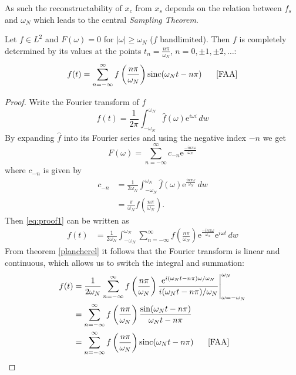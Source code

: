\noindent As such the reconstructability of $x_c$ from $x_s$ depends on the relation between $f_s$ and $\omega_N$ which leads to the central \textit{Sampling Theorem}.
\begin{theorem}\label{sampling_theorem}
Let $f\in L^2$ and $F(\omega)=0$ for $|\omega|\geq \omega_N$ ($f$ bandlimited). Then $f$ is completely determined by its values at the points $t_n=\frac{n\pi}{\omega_N}$, $n=0,\pm 1,\pm 2,\ldots$:
\begin{equation*}
f(t)=\sum_{n=-\infty}^{\infty}f\left(\frac{n\pi}{\omega_N}\right)\mathrm{sinc}(\omega_Nt-n\pi)\phantom{mm}\text{\cite{FAA}}
\end{equation*}
\end{theorem}
\begin{proof}
Write the Fourier transform of $f$
\begin{equation}\label{eq:proof1}
f(t)=\frac{1}{2\pi}\int_{-\omega_N}^{\omega_N}\!\hat{f}(\omega)\mathrm{e}^{i\omega i}\,dw
\end{equation}
By expanding $\hat{f}$ into its Fourier series and using the negative index $-n$ we get
\begin{equation*}
F(\omega)=\sum_{n=-\infty}^{\infty}c_{-n}\mathrm{e}^{\frac{-in\pi\omega}{\omega_N}}
\end{equation*}
where $c_{-n}$ is given by
\begin{align*}
c_{-n}&=\frac{1}{2\omega_N}\int_{-\omega_N}^{\omega_N}\!\hat{f}(\omega)\mathrm{e}^{\frac{in\pi\omega}{\omega_N}}\,dw\\
&=\frac{\pi}{\omega_N}f\left(\frac{n\pi}{\omega_N}\right).
\end{align*}
Then \eqref{eq:proof1} can be written as
\begin{align*}
f(t)&=\frac{1}{2\omega_N}\int_{-\omega_N}^{\omega_N}\!\sum_{n=-\infty}^{\infty}f\left(\frac{n\pi}{\omega_N}\right)\mathrm{e}^{\frac{-in\pi\omega}{\omega_N}}\mathrm{e}^{i\omega t}\,dw
\end{align*}
From theorem \ref{plancherel} it follows that the Fourier transform is linear and continuous, which allows us to switch the integral and summation:
\begin{align*}
f(t)&=\frac{1}{2\omega_N}\sum_{n=-\infty}^{\infty}f\left(\frac{n\pi}{\omega_N}\right)\frac{\mathrm{e}^{i(\omega_Nt-n\pi)\omega/\omega_N}}{i(\omega_Nt-n\pi)/\omega_N}\Bigg|_{\omega=-\omega_N}^{\omega_N}\\
&=\sum_{n=-\infty}^{\infty}f\left(\frac{n\pi}{\omega_N}\right)\frac{\sin(\omega_Nt-n\pi)}{\omega_Nt-n\pi}\\
&=\sum_{n=-\infty}^{\infty}f\left(\frac{n\pi}{\omega_N}\right)\mathrm{sinc}(\omega_Nt-n\pi)\phantom{mm}\text{\cite{FAA}}
\end{align*}
\end{proof}
